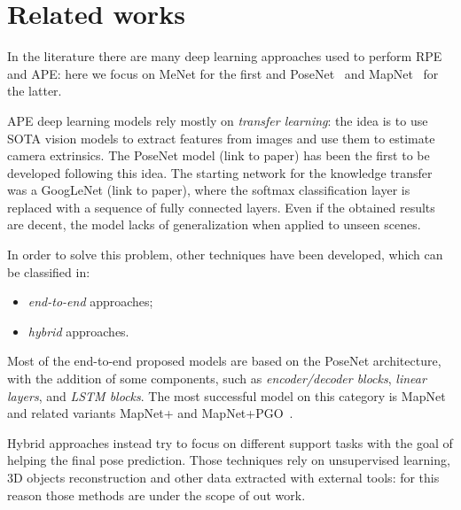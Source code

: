 \section{Related works}
In the literature there are many deep learning approaches used to perform RPE and APE: here we focus on MeNet for the first and PoseNet~\cite{9348762} and MapNet~\cite{DBLP:journals/corr/abs-1712-03342} for the latter.

APE deep learning models rely mostly on \emph{transfer learning}: the idea is to use SOTA vision models to extract features from images and use them to estimate camera extrinsics.
The PoseNet model (link to paper) has been the first to be developed following this idea. The starting network for the knowledge transfer was a GoogLeNet (link to paper), where the softmax classification layer is replaced with a sequence of fully connected layers. Even if the obtained results are decent, the model lacks of generalization when applied to unseen scenes.

In order to solve this problem, other techniques have been developed, which can be classified in:
\begin{itemize}
    \item \emph{end-to-end} approaches;
    \item \emph{hybrid} approaches.
\end{itemize}

Most of the end-to-end proposed models are based on the PoseNet architecture, with the addition of some components, such as \emph{encoder/decoder blocks}, \emph{linear layers}, and \emph{LSTM blocks}. The most successful model on this category is MapNet and related variants MapNet+ and MapNet+PGO~\cite{DBLP:journals/corr/abs-1712-03342}.

Hybrid approaches instead try to focus on different support tasks with the goal of helping the final pose prediction. Those techniques rely on unsupervised learning, 3D objects reconstruction and other data extracted with external tools: for this reason those methods are under the scope of out work.
